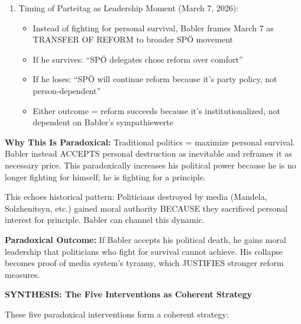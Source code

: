 \begin{enumerate}
\item Timing of Parteitag as Leadership Moment (March 7, 2026):

  \begin{itemize}
  \item Instead of fighting for personal survival, Babler frames March 7 as TRANSFER OF REFORM
    to broader SPÖ movement
  \item If he survives: ``SPÖ delegates chose reform over comfort''
  \item If he loses: ``SPÖ will continue reform because it's party policy, not person-dependent''
  \item Either outcome = reform succeeds because it's institutionalized, not dependent on Babler's sympathiewerte
  \end{itemize}

\end{enumerate}

\textbf{Why This Is Paradoxical:} Traditional politics = maximize personal survival. Babler instead ACCEPTS
personal destruction as inevitable and reframes it as necessary price. This paradoxically increases his political
power because he is no longer fighting for himself; he is fighting for a principle.

This echoes historical pattern: Politicians destroyed by media (Mandela, Solzhenitsyn, etc.) gained moral authority
BECAUSE they sacrificed personal interest for principle. Babler can channel this dynamic.

\textbf{Paradoxical Outcome:} If Babler accepts his political death, he gains moral leadership that politicians
who fight for survival cannot achieve. His collapse becomes proof of media system's tyranny, which JUSTIFIES
stronger reform measures.

\vspace{0.5cm}

\textbf{SYNTHESIS: The Five Interventions as Coherent Strategy}

These five paradoxical interventions form a coherent strategy:

